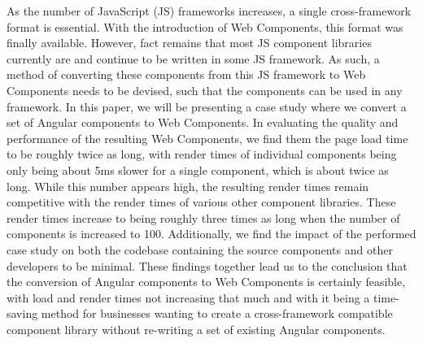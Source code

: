 As the number of JavaScript (JS) frameworks increases, a single cross-framework format is essential. With the introduction of Web Components, this format was finally available. However, fact remains that most JS component libraries currently are and continue to be written in some JS framework. As such, a method of converting these components from this JS framework to Web Components needs to be devised, such that the components can be used in any framework. In this paper, we will be presenting a case study where we convert a set of Angular components to Web Components. In evaluating the quality and performance of the resulting Web Components, we find them the page load time to be roughly twice as long, with render times of individual components being only being about 5ms slower for a single component, which is about twice as long. While this number appears high, the resulting render times remain competitive with the render times of various other component libraries. These render times increase to being roughly three times as long when the number of components is increased to 100. Additionally, we find the impact of the performed case study on both the codebase containing the source components and other developers to be minimal. These findings together lead us to the conclusion that the conversion of Angular components to Web Components is certainly feasible, with load and render times not increasing that much and with it being a time-saving method for businesses wanting to create a cross-framework compatible component library without re-writing a set of existing Angular components.